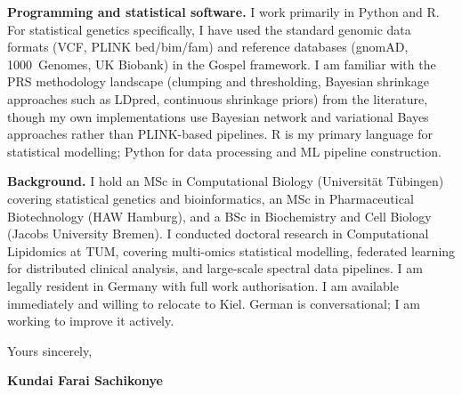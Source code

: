 \documentclass[12pt,a4paper]{article}
\begin{document}
\textbf{Programming and statistical software.}
I work primarily in Python and R. For statistical genetics specifically,
I have used the standard genomic data formats (VCF, PLINK bed/bim/fam)
and reference databases (gnomAD, 1000~Genomes, UK Biobank) in the Gospel
framework. I am familiar with the PRS methodology landscape (clumping and
thresholding, Bayesian shrinkage approaches such as LDpred, continuous
shrinkage priors) from the literature, though my own implementations use
Bayesian network and variational Bayes approaches rather than PLINK-based
pipelines.
R is my primary language for statistical modelling; Python for data processing
and ML pipeline construction.

\textbf{Background.}
I hold an MSc in Computational Biology (Universität Tübingen) covering
statistical genetics and bioinformatics, an MSc in Pharmaceutical Biotechnology
(HAW Hamburg), and a BSc in Biochemistry and Cell Biology (Jacobs University
Bremen). I conducted doctoral research in Computational Lipidomics at TUM,
covering multi-omics statistical modelling, federated learning for distributed
clinical analysis, and large-scale spectral data pipelines.
I am legally resident in Germany with full work authorisation.
I am available immediately and willing to relocate to Kiel.
German is conversational; I am working to improve it actively.

\vspace{1.5em}
Yours sincerely,

\vspace{2.5em}
\textbf{Kundai Farai Sachikonye}
\end{document}
